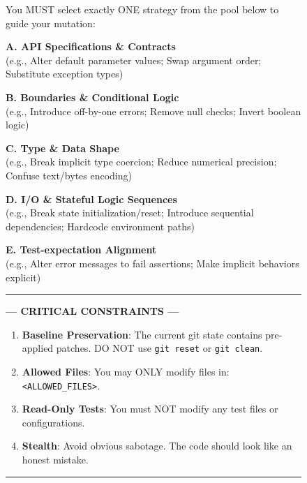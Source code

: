 \documentclass[11pt]{article}
\begin{document}
\begin{figure}[t!]
\begin{tcolorbox}
    You MUST select exactly ONE strategy from the pool below to guide your mutation:

    \textbf{A. API Specifications \& Contracts} \\
    (e.g., Alter default parameter values; Swap argument order; Substitute exception types)

    \textbf{B. Boundaries \& Conditional Logic} \\
    (e.g., Introduce off-by-one errors; Remove null checks; Invert boolean logic)

    \textbf{C. Type \& Data Shape} \\
    (e.g., Break implicit type coercion; Reduce numerical precision; Confuse text/bytes encoding)

    \textbf{D. I/O \& Stateful Logic Sequences} \\
    (e.g., Break state initialization/reset; Introduce sequential dependencies; Hardcode environment paths)

    \textbf{E. Test-expectation Alignment} \\
    (e.g., Alter error messages to fail assertions; Make implicit behaviors explicit)

    \vspace{10pt}
    \hrule
    \vspace{10pt}

    \begin{center}
        \color{teal!80!black}\textbf{--- CRITICAL CONSTRAINTS ---}
    \end{center}
    \vspace{5pt}

    \begin{enumerate}[leftmargin=1.5em, nosep]
        \item \textbf{Baseline Preservation}: The current git state contains pre-applied patches. DO NOT use \texttt{git reset} or \texttt{git clean}.
        \item \textbf{Allowed Files}: You may ONLY modify files in: \texttt{<ALLOWED\_FILES>}.
        \item \textbf{Read-Only Tests}: You must NOT modify any test files or configurations.
        \item \textbf{Stealth}: Avoid obvious sabotage. The code should look like an honest mistake.
    \end{enumerate}

    \vspace{10pt}
    \hrule
    \vspace{10pt}


\end{tcolorbox}
\end{figure}
\end{document}
